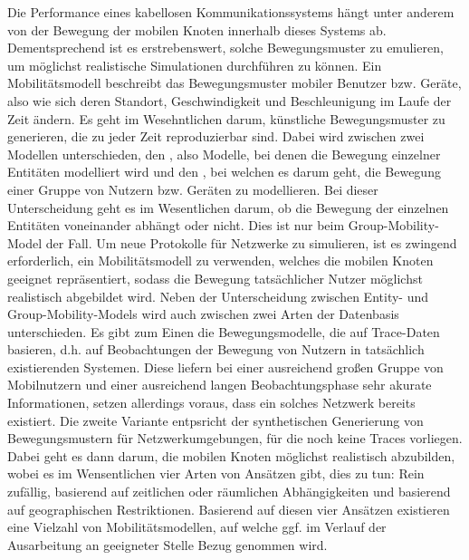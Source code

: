 \documentclass[12pt, a4paper]{article}
\begin{document}
Die Performance eines kabellosen Kommunikationssystems hängt unter anderem von der Bewegung
der mobilen Knoten innerhalb dieses Systems ab. Dementsprechend ist es erstrebenswert,
solche Bewegungsmuster zu emulieren, um möglichst realistische Simulationen durchführen zu können.
Ein Mobilitätsmodell beschreibt das Bewegungsmuster mobiler Benutzer bzw. Geräte,
also wie sich deren Standort, Geschwindigkeit und Beschleunigung im Laufe der Zeit ändern.
Es geht im Wesehntlichen darum, künstliche Bewegungsmuster zu generieren, die zu jeder Zeit reproduzierbar sind.
\newline\newline
Dabei wird zwischen zwei Modellen unterschieden, den ,
also Modelle, bei denen die Bewegung einzelner Entitäten modelliert wird und den ,
bei welchen es darum geht, die Bewegung einer Gruppe von Nutzern bzw. Geräten zu modellieren.
Bei dieser Unterscheidung geht es im Wesentlichen darum, ob die Bewegung der einzelnen Entitäten voneinander abhängt oder nicht.
Dies ist nur beim Group-Mobility-Model der Fall.
\newline\newline
Um neue Protokolle für Netzwerke zu simulieren, ist es zwingend erforderlich, ein Mobilitätsmodell zu verwenden,
welches die mobilen Knoten geeignet repräsentiert, sodass die Bewegung tatsächlicher Nutzer möglichst realistisch abgebildet wird.
\newline\newline
Neben der Unterscheidung zwischen Entity- und Group-Mobility-Models wird auch zwischen zwei Arten der Datenbasis unterschieden.
Es gibt zum Einen die Bewegungsmodelle, die auf Trace-Daten basieren, d.h. auf Beobachtungen der Bewegung von Nutzern
in tatsächlich existierenden Systemen. Diese liefern bei einer ausreichend großen Gruppe von Mobilnutzern und einer ausreichend
langen Beobachtungsphase sehr akurate Informationen, setzen allerdings voraus, dass ein solches Netzwerk bereits existiert.
Die zweite Variante entpsricht der synthetischen Generierung von Bewegungsmustern für Netzwerkumgebungen, für die noch keine
Traces vorliegen. Dabei geht es dann darum, die mobilen Knoten möglichst realistisch abzubilden, wobei es im Wensentlichen vier
Arten von Ansätzen gibt, dies zu tun: Rein zufällig, basierend auf zeitlichen oder räumlichen Abhängigkeiten und basierend
auf geographischen Restriktionen. Basierend auf diesen vier Ansätzen existieren eine Vielzahl von Mobilitätsmodellen,
auf welche ggf. im Verlauf der Ausarbeitung an geeigneter Stelle Bezug genommen wird.
\end{document}
